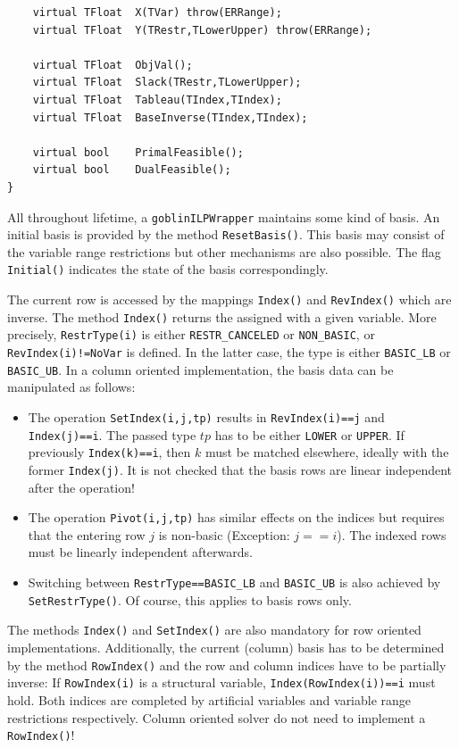 \documentclass[a4paper,11pt,twoside]{book}
\begin{document}
\begin{multicols}{2}
\begin{mymethods}
\begin{verbatim}
    virtual TFloat  X(TVar) throw(ERRange);
    virtual TFloat  Y(TRestr,TLowerUpper) throw(ERRange);

    virtual TFloat  ObjVal();
    virtual TFloat  Slack(TRestr,TLowerUpper);
    virtual TFloat  Tableau(TIndex,TIndex);
    virtual TFloat  BaseInverse(TIndex,TIndex);

    virtual bool    PrimalFeasible();
    virtual bool    DualFeasible();
}
\end{verbatim}
\end{mymethods}
All throughout lifetime, a \verb/goblinILPWrapper/ maintains some kind of
basis. An initial basis is provided by the method \verb/ResetBasis()/.
This basis may consist of the variable range restrictions but other mechanisms
are also possible. The flag \verb/Initial()/ indicates the state of the basis
correspondingly.

The current row  is accessed by the mappings \verb/Index()/ and
\verb/RevIndex()/ which are inverse. The method \verb/Index()/ returns the
 assigned with a given variable. More precisely,
\verb/RestrType(i)/ is either \verb/RESTR_CANCELED/ or \verb/NON_BASIC/,
or \verb/RevIndex(i)!=NoVar/ is defined. In the latter case, the type is either
\verb/BASIC_LB/ or \verb/BASIC_UB/. In a column oriented implementation, the
basis data can be manipulated as follows:
\begin{itemize}
\item The operation \verb/SetIndex(i,j,tp)/ results in \verb/RevIndex(i)==j/
    and \verb/Index(j)==i/. The passed type $tp$ has to be either \verb/LOWER/
    or \verb/UPPER/. If previously \verb/Index(k)==i/, then $k$ must be matched
    elsewhere, ideally with the former \verb/Index(j)/. It is not checked that
    the basis rows are linear independent after the operation!
\item The operation \verb/Pivot(i,j,tp)/ has similar effects on the indices but
    requires that the entering row $j$ is non-basic (Exception: $j==i$). The
    indexed rows must be linearly independent afterwards.
\item Switching between \verb/RestrType==BASIC_LB/ and \verb/BASIC_UB/ is also
    achieved by \verb/SetRestrType()/. Of course, this applies to
    basis rows only.
\end{itemize}
The methods \verb/Index()/ and \verb/SetIndex()/ are also mandatory for row
oriented implementations. Additionally, the current (column) basis has to be
determined by the method \verb/RowIndex()/ and the row and column indices
have to be partially inverse: If \verb/RowIndex(i)/ is a structural variable,
\verb/Index(RowIndex(i))==i/ must hold. Both indices are completed by
artificial variables and variable range restrictions respectively. Column
oriented solver do not need to implement a \verb/RowIndex()/!


\end{multicols}
\end{document}
